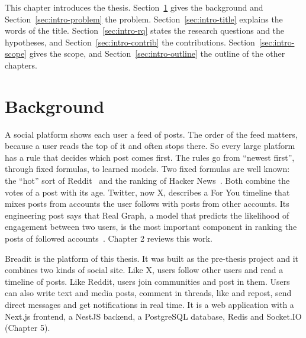 
\label{ch:intro}

This chapter introduces the thesis. Section~\ref{sec:intro-background} gives the background and Section~\ref{sec:intro-problem} the problem. Section~\ref{sec:intro-title} explains the words of the title. Section~\ref{sec:intro-rq} states the research questions and the hypotheses, and Section~\ref{sec:intro-contrib} the contributions. Section~\ref{sec:intro-scope} gives the scope, and Section~\ref{sec:intro-outline} the outline of the other chapters.

\section{Background}
\label{sec:intro-background}

A social platform shows each user a feed of posts. The order of the feed matters, because a user reads the top of it and often stops there. So every large platform has a rule that decides which post comes first. The rules go from ``newest first'', through fixed formulas, to learned models. Two fixed formulas are well known: the ``hot'' sort of Reddit~ and the ranking of Hacker News~. Both combine the votes of a post with its age. Twitter, now X, describes a For You timeline that mixes posts from accounts the user follows with posts from other accounts. Its engineering post says that Real Graph, a model that predicts the likelihood of engagement between two users, is the most important component in ranking the posts of followed accounts~. Chapter 2 reviews this work.

Breadit is the platform of this thesis. It was built as the pre-thesis project and it combines two kinds of social site. Like X, users follow other users and read a timeline of posts. Like Reddit, users join communities and post in them. Users can also write text and media posts, comment in threads, like and repost, send direct messages and get notifications in real time. It is a web application with a Next.js frontend, a NestJS backend, a PostgreSQL database, Redis and Socket.IO (Chapter 5).

